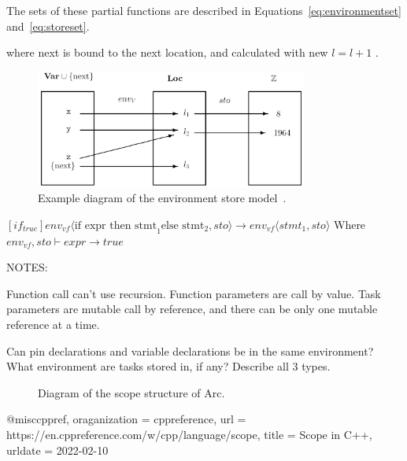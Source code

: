 The sets of these partial functions are described in Equations~\ref{eq:environmentset} and~\ref{eq:storeset}.


where next is bound to the next location, and calculated with new $l = l + 1$ .




\begin{figure}[htbp]
    \centering
    \includegraphics[width=0.8\textwidth]{figures/Environment_Store.png}
    \caption{Example diagram of the environment store model~\cite{Huttel2010}.}
    \label{fig:envstomodel}
\end{figure}


$[if_{true}]
    env_{vf}\langle \text{if expr then stmt}_1 \text{else stmt}_2,sto \rangle \rightarrow env_{vf} \langle stmt_1,sto\rangle$
Where  $env_{vf},sto \vdash expr \to true$



NOTES:

Function call can't use recursion.
Function parameters are call by value.
Task parameters are mutable call by reference, and there can be only one mutable reference at a time.

Can pin declarations and variable declarations be in the same environment?
What environment are tasks stored in, if any? Describe all 3 types.











\begin{figure}[htbp]
    \centering
    \caption{Diagram of the scope structure of Arc.}
    \label{fig:arcscoperules}
\end{figure}


@misc{cppref,
    oraganization       = {cppreference},
    url = {https://en.cppreference.com/w/cpp/language/scope},
    title        = {Scope in C++},
    urldate = {2022-02-10}
}